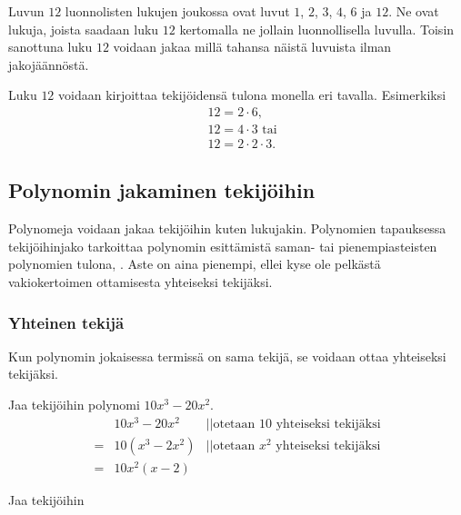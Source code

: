 Luvun $12$  luonnolisten lukujen joukossa ovat luvut $1$, $2$, $3$, $4$, $6$ ja $12$. Ne ovat lukuja, joista saadaan luku $12$ kertomalla ne jollain luonnollisella luvulla. Toisin sanottuna luku $12$ voidaan jakaa millä tahansa näistä luvuista ilman jakojäännöstä.

\begin{esimerkki}
Luku $12$ voidaan kirjoittaa tekijöidensä tulona monella eri tavalla. Esimerkiksi
\begin{align*}
&12 = 2 \cdot 6, \\
&12= 4 \cdot 3 \text{ tai} \\
&12= 2 \cdot 2 \cdot 3.
\end{align*}
\end{esimerkki}

\subsection{Polynomin jakaminen tekijöihin}


Polynomeja voidaan jakaa tekijöihin kuten lukujakin. Polynomien tapauksessa tekijöihinjako tarkoittaa polynomin esittämistä saman- tai pienempiasteisten polynomien tulona, . Aste on aina pienempi, ellei kyse ole pelkästä vakiokertoimen ottamisesta yhteiseksi tekijäksi.

\subsubsection*{Yhteinen tekijä}

Kun polynomin jokaisessa termissä on sama tekijä, se voidaan ottaa yhteiseksi tekijäksi.

\newpage %
\begin{esimerkki}
Jaa tekijöihin polynomi $10x^3-20x^2$.
\begin{align*}
& 10x^3-20x^2 & ||\text{otetaan $10$ yhteiseksi tekijäksi}\\
=& 10(x^3-2x^2) &||\text{otetaan $x^2$ yhteiseksi tekijäksi} \\
=& 10x^2(x-2)  
\end{align*}
\end{esimerkki}

\begin{esimerkki}
Jaa tekijöihin
\end{esimerkki}

